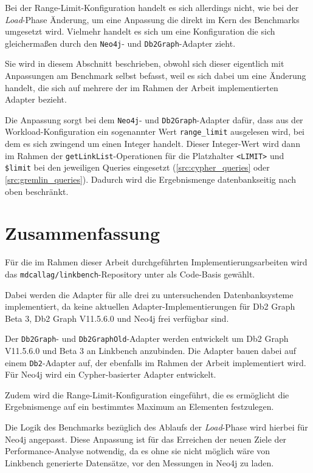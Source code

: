 Bei der Range-Limit-Konfiguration handelt es sich allerdings nicht, wie bei der \textit{Load}-Phase Änderung, um eine Anpassung die direkt im Kern des Benchmarks umgesetzt wird. Vielmehr handelt es sich um eine Konfiguration die sich gleichermaßen durch den \texttt{Neo4j}- und \texttt{Db2Graph}-Adapter zieht. 

Sie wird in diesem Abschnitt beschrieben, obwohl sich dieser eigentlich mit Anpassungen am Benchmark selbst befasst, weil es sich dabei um eine Änderung handelt, die sich auf mehrere der im Rahmen der Arbeit implementierten Adapter bezieht.

Die Anpassung sorgt bei dem \texttt{Neo4j}- und \texttt{Db2Graph}-Adapter dafür, dass aus der Workload-Konfiguration ein sogenannter Wert \texttt{range\_limit} ausgelesen wird, bei dem es sich zwingend um einen Integer handelt. Dieser Integer-Wert wird dann im Rahmen der \texttt{getLinkList}-Ope\-ra\-ti\-on\-en für die Platzhalter \texttt{<LIMIT>} und \texttt{\$limit} bei den jeweiligen Queries eingesetzt (\autoref{src:cypher_queries} oder \autoref{src:gremlin_queries}). Dadurch wird die Ergebnismenge datenbankseitig nach oben beschränkt. 

\section{Zusammenfassung}
\label{implementierung:zusammenfassung}
Für die im Rahmen dieser Arbeit durchgeführten Implementierungsarbeiten wird das \texttt{mdcallag/linkbench}-Repository unter \cite{mc_linkbench_github} als Code-Basis gewählt.

Dabei werden die Adapter für alle drei zu untersuchenden Datenbanksysteme implementiert, da keine aktuellen Adapter-Implementierungen für Db2 Graph Beta 3, Db2 Graph V11.5.6.0 und Neo4j frei verfügbar sind.

Der \texttt{Db2Graph}- und \texttt{Db2GraphOld}-Adapter werden entwickelt um Db2 Graph V11.5.6.0 und Beta 3 an Linkbench anzubinden. Die Adapter bauen dabei auf einem \texttt{Db2}-Adapter auf, der ebenfalls im Rahmen der Arbeit implementiert wird. Für Neo4j wird ein Cypher-basierter Adapter entwickelt. 

Zudem wird die Range-Limit-Konfiguration eingeführt, die es ermöglicht die Ergebnismenge auf ein bestimmtes Maximum an Elementen festzulegen. 

Die Logik des Benchmarks bezüglich des Ablaufs der \textit{Load}-Phase wird hierbei für Neo4j angepasst. Diese Anpassung ist für das Erreichen der neuen Ziele der Performance-Analyse notwendig, da es ohne sie nicht möglich wäre von Linkbench generierte Datensätze, vor den Messungen in Neo4j zu laden. 